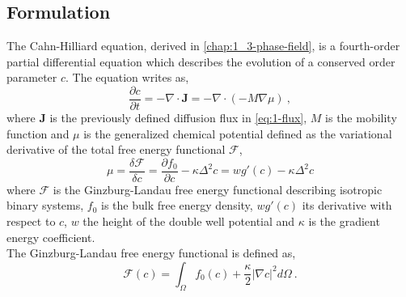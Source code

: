 \subsection{Formulation}
    The Cahn-Hilliard equation, derived in \autoref{chap:1_3-phase-field}, is a fourth-order partial differential equation which describes the evolution of a conserved order parameter $c$. The equation writes as,
    \begin{equation}\label{eq:2-ch}
        \frac{\partial c}{\partial t} = -\nabla \cdot \mathbf{J} = -\nabla \cdot \left( -M \nabla \mu \right)\ ,
    \end{equation}
    where $\mathbf{J}$ is the previously defined diffusion flux in \autoref{eq:1-flux}, $M$ is the mobility function and $\mu$ is the generalized chemical potential defined as the variational derivative of the total free energy functional $\mathcal{F}$,
    \begin{equation}\label{eq:2-mu}
        \mu = \frac{\delta \mathcal{F}}{\delta c} = \frac{\partial f_0}{\partial c} - \kappa \Delta^2 c = wg'(c) - \kappa \Delta^2 c
    \end{equation}
    where $\mathcal{F}$ is the Ginzburg-Landau free energy functional describing isotropic binary systems, $f_0$ is the bulk free energy density, $wg'(c)$ its derivative with respect to $c$, $w$ the height of the double well potential and $\kappa$ is the gradient energy coefficient.\\
    The Ginzburg-Landau free energy functional is defined as,
    \begin{equation}\label{eq:2-free-energy}
        \mathcal{F}(c) = \int_\Omega f_0(c) + \frac{\kappa}{2} |\nabla c|^2 d\Omega\ .
    \end{equation}
